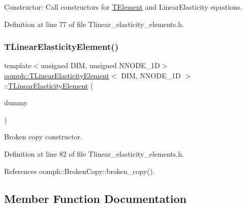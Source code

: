 Constructor\+: Call constructors for \hyperlink{classoomph_1_1TElement}{T\+Element} and Linear\+Elasticity equations. 



Definition at line 77 of file Tlinear\+\_\+elasticity\+\_\+elements.\+h.

\mbox{\label{classoomph_1_1TLinearElasticityElement_a20c742e8456b3f7b568131bd0ef54b96}} 
\subsubsection{\texorpdfstring{T\+Linear\+Elasticity\+Element()}{TLinearElasticityElement()}\hspace{0.1cm}{\footnotesize\ttfamily [2/2]}}
{\footnotesize\ttfamily template$<$unsigned D\+IM, unsigned N\+N\+O\+D\+E\+\_\+1D$>$ \\
\hyperlink{classoomph_1_1TLinearElasticityElement}{oomph\+::\+T\+Linear\+Elasticity\+Element}$<$ D\+IM, N\+N\+O\+D\+E\+\_\+1D $>$\+::\hyperlink{classoomph_1_1TLinearElasticityElement}{T\+Linear\+Elasticity\+Element} (\begin{DoxyParamCaption}\item[{const \hyperlink{classoomph_1_1TLinearElasticityElement}{T\+Linear\+Elasticity\+Element}$<$ D\+IM, N\+N\+O\+D\+E\+\_\+1D $>$ \&}]{dummy }\end{DoxyParamCaption})\hspace{0.3cm}{\ttfamily [inline]}}



Broken copy constructor. 



Definition at line 82 of file Tlinear\+\_\+elasticity\+\_\+elements.\+h.



References oomph\+::\+Broken\+Copy\+::broken\+\_\+copy().



\subsection{Member Function Documentation}
\mbox{\label{classoomph_1_1TLinearElasticityElement_a6dd9de6d6ca3ede5624bd56d45c27445}} 
